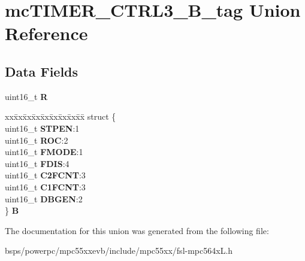 \hypertarget{unionmcTIMER__CTRL3__16B__tag}{}\section{mc\+T\+I\+M\+E\+R\+\_\+\+C\+T\+R\+L3\+\_\+B\+\_\+tag Union Reference}
\label{unionmcTIMER__CTRL3__16B__tag}
\subsection*{Data Fields}
\begin{DoxyCompactItemize}
\item 
\mbox{\label{unionmcTIMER__CTRL3__16B__tag_a43fdd46b726a64f4b89828cc349b660a}} 
uint16\+\_\+t {\bfseries R}
\item 
\mbox{\label{unionmcTIMER__CTRL3__16B__tag_a831be0ad74fb9438c16b171801317b25}} 
\begin{tabbing}
xx\=xx\=xx\=xx\=xx\=xx\=xx\=xx\=xx\=\kill
struct \{\\
\>uint16\_t {\bfseries STPEN}:1\\
\>uint16\_t {\bfseries ROC}:2\\
\>uint16\_t {\bfseries FMODE}:1\\
\>uint16\_t {\bfseries FDIS}:4\\
\>uint16\_t {\bfseries C2FCNT}:3\\
\>uint16\_t {\bfseries C1FCNT}:3\\
\>uint16\_t {\bfseries DBGEN}:2\\
\} {\bfseries B}\\

\end{tabbing}\end{DoxyCompactItemize}


The documentation for this union was generated from the following file\+:\begin{DoxyCompactItemize}
\item 
bsps/powerpc/mpc55xxevb/include/mpc55xx/fsl-\/mpc564x\+L.\+h\end{DoxyCompactItemize}
